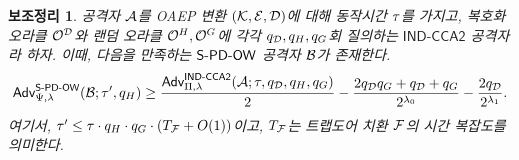 \documentclass{article}
\newtheorem{lemma}{보조정리}
\theoremstyle{definition}
\begin{document}
\begin{tcolorbox}[colback=white]
	\begin{lemma}
		공격자 $\mathcal{A}$를 OAEP 변환 $(\mathcal{K}, \mathcal{E}, \mathcal{D})$에 대해 동작시간
		$\tau$를 가지고, 복호화 오라클 $\mathcal{O}^{\mathcal{D}}$와 랜덤 오라클 $\mathcal{O}^{H},
		\mathcal{O}^{G}$에 각각 $q_{\mathcal{D}}, q_{H}, q_{G}$회 질의하는
		$\textsf{IND-CCA2}$ 공격자라 하자. 이때, 다음을 만족하는 $\textsf{S-PD-OW}$
		공격자 $\mathcal{B}$가 존재한다.
		$$
			\textsf{Adv}^{\textsf{S-PD-OW}}_{\Psi, \lambda}(\mathcal{B}; \tau', q_{H})
		  	\ge \frac{\textsf{Adv}^{\textsf{IND-CCA2}}_{\Pi, \lambda}(\mathcal{A}; \tau, q_{\mathcal{D}}, q_{H}, q_{G})}{2}
		   	- \frac{2q_{\mathcal{D}}q_{G} + q_{\mathcal{D}} + q_{G}}{2^{\lambda_0}}
		   	- \frac{2q_{\mathcal{D}}}{2^{\lambda_1}}.
		$$
	  	여기서, $\tau' \le \tau \cdot q_{H} \cdot q_{G} \cdot (T_{\mathcal{F}} +
	   	O(1))$이고, $T_{\mathcal{F}}$는 트랩도어 치환 $\mathcal{F}$의 시간 복잡도를 의미한다.
	\end{lemma}
\end{tcolorbox}






\end{document}
